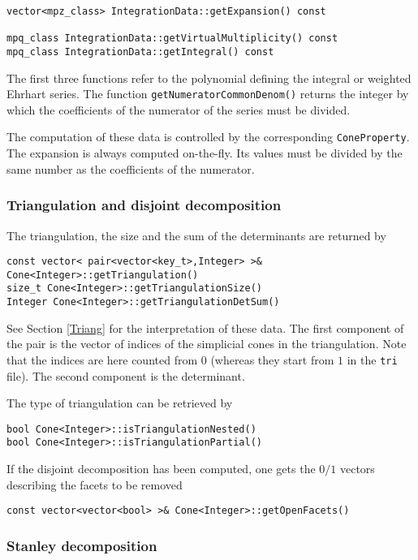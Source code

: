 \documentclass[12pt,a4paper]{scrartcl}
\theoremstyle{definition}
\begin{document}
\begin{small}
\begin{Verbatim}
vector<mpz_class> IntegrationData::getExpansion() const

mpq_class IntegrationData::getVirtualMultiplicity() const
mpq_class IntegrationData::getIntegral() const
\end{Verbatim}

The first three functions refer to the polynomial defining the integral or weighted Ehrhart series. The function \verb|getNumeratorCommonDenom()| returns the integer by which the coefficients of the numerator of the series must be divided.

The computation of these data is controlled by the corresponding \verb|ConeProperty|. The expansion is always  computed on-the-fly. Its values must be divided by the same number as the coefficients of the numerator.

\subsubsection{Triangulation and disjoint decomposition}

The triangulation, the size and the sum of the determinants are returned by
\begin{Verbatim}
const vector< pair<vector<key_t>,Integer> >& Cone<Integer>::getTriangulation()
size_t Cone<Integer>::getTriangulationSize()
Integer Cone<Integer>::getTriangulationDetSum() 
\end{Verbatim}
See Section \ref{Triang} for the interpretation of these data. The first component of the pair is the vector of indices of the simplicial cones in the triangulation. Note that the indices are here counted from $0$ (whereas they start from $1$ in the \verb|tri| file). The second component is the determinant.

The type of triangulation can be retrieved by
\begin{Verbatim}
bool Cone<Integer>::isTriangulationNested()
bool Cone<Integer>::isTriangulationPartial()
\end{Verbatim}

If the disjoint decomposition has been computed, one gets the $0/1$ vectors describing the facets to be removed 

\begin{Verbatim}
const vector<vector<bool> >& Cone<Integer>::getOpenFacets()
\end{Verbatim}

\subsubsection{Stanley decomposition}


\end{small}
\end{document}
